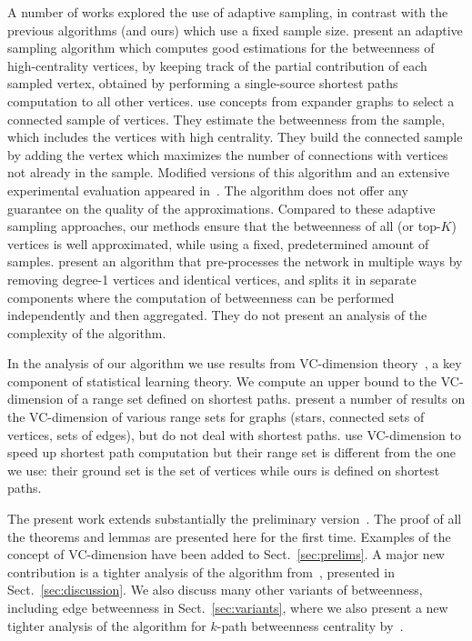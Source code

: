 A number of works explored
the use of adaptive sampling, in contrast with the previous algorithms (and
ours) which use a fixed sample size. \citet{BaderKMM07} present an adaptive
sampling algorithm which computes good estimations for the betweenness of
high-centrality vertices, by keeping track of the partial contribution of each
sampled vertex, obtained by performing a single-source shortest paths
computation to all other vertices. \citet{MaiyaBW10} use concepts from expander
graphs to select a connected sample of vertices. They estimate the betweenness
from the sample, which includes the vertices with high centrality. They build
the connected sample by adding the vertex which maximizes the number of
connections with vertices not already in the sample. Modified versions
of this algorithm and an extensive experimental evaluation appeared
in~\citep{LimMRTB11}. The algorithm does not offer any guarantee on the quality
of the approximations. Compared to these adaptive sampling approaches, our
methods ensure that the betweenness of all (or top-$K$) vertices is well
approximated, while using a fixed, predetermined amount of samples.
\citet{SaryuceSKC13} present an algorithm that pre-processes the network in
multiple ways by removing degree-1 vertices and identical vertices, and splits it
in separate components where the computation of betweenness can be performed
independently and then aggregated. They do not present an analysis of the
complexity of the algorithm. 

In the analysis of our algorithm we use results from VC-dimension
theory~\citep{VapnikC71}, a key component of statistical learning theory. We
compute an upper bound to the VC-dimension of a range set defined on shortest
paths. \citet{KranakisKRUW97} present a number of results on the VC-dimension of
various range sets for graphs (stars, connected sets of vertices, sets of
edges), but do not deal with shortest paths. \citet{AbrahamDFGW11} use
VC-dimension to speed up shortest path computation but their range set is
different from the one we use: their ground set is the set of vertices while
ours is defined on shortest paths.

\ifproof
The present work extends substantially the preliminary
version~\citep{RiondatoK14WSDM}. The proof of all the theorems and lemmas are
presented here for the first time. Examples of the concept of VC-dimension have
been added to Sect.~\ref{sec:prelims}. A major new contribution is a tighter
analysis of the algorithm from~\citep{BrandesP07}, presented in
Sect.~\ref{sec:discussion}. We also discuss many other variants of betweenness,
including edge betweenness in Sect.~\ref{sec:variants}, where we also present a
new tighter analysis of the algorithm for $k$-path betweenness centrality
by~\citep{KourtellisASIT12}.  %
\fi

